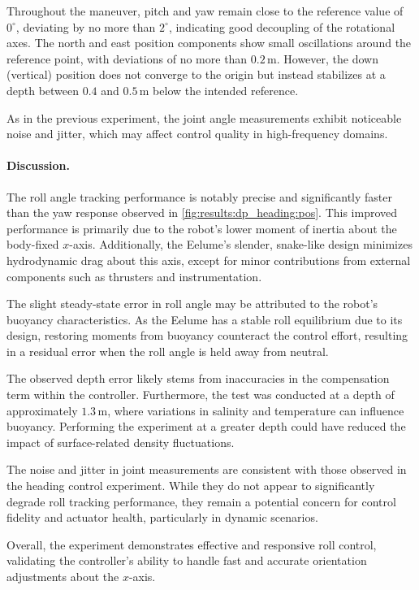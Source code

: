 Throughout the maneuver, pitch and yaw remain close to the reference value of
\(0^\circ\), deviating by no more than \(2^\circ\), indicating good decoupling 
of the rotational axes. The north and east position components show small 
oscillations around the reference point, with deviations of no more than
\(0.2\,\mathrm{m}\). However, the down (vertical) position does not converge 
to the origin but instead stabilizes at a depth between \(0.4\) and
\(0.5\,\mathrm{m}\) below the intended reference.

As in the previous experiment, the joint angle measurements exhibit noticeable 
noise and jitter, which may affect control quality in high-frequency domains.

\paragraph{Discussion.}

The roll angle tracking performance is notably precise and significantly 
faster than the yaw response observed in \autoref{fig:results:dp_heading:pos}. 
This improved performance is primarily due to the robot’s lower moment of 
inertia about the body-fixed \(x\)-axis. Additionally, the Eelume’s slender, 
snake-like design minimizes hydrodynamic drag about this axis, except for 
minor contributions from external components such as thrusters and instrumentation.

The slight steady-state error in roll angle may be attributed to the robot’s 
buoyancy characteristics. As the Eelume has a stable roll equilibrium due to 
its design, restoring moments from buoyancy counteract the control effort, 
resulting in a residual error when the roll angle is held away from neutral.

The observed depth error likely stems from inaccuracies in the compensation 
term within the controller. Furthermore, the test was conducted at a depth of 
approximately \(1.3\,\mathrm{m}\), where variations in salinity and 
temperature can influence buoyancy. Performing the experiment at a greater 
depth could have reduced the impact of surface-related density fluctuations.

The noise and jitter in joint measurements are consistent with those observed 
in the heading control experiment. While they do not appear to significantly 
degrade roll tracking performance, they remain a potential concern for control 
fidelity and actuator health, particularly in dynamic scenarios.

Overall, the experiment demonstrates effective and responsive roll control, 
validating the controller’s ability to handle fast and accurate orientation 
adjustments about the \(x\)-axis.

